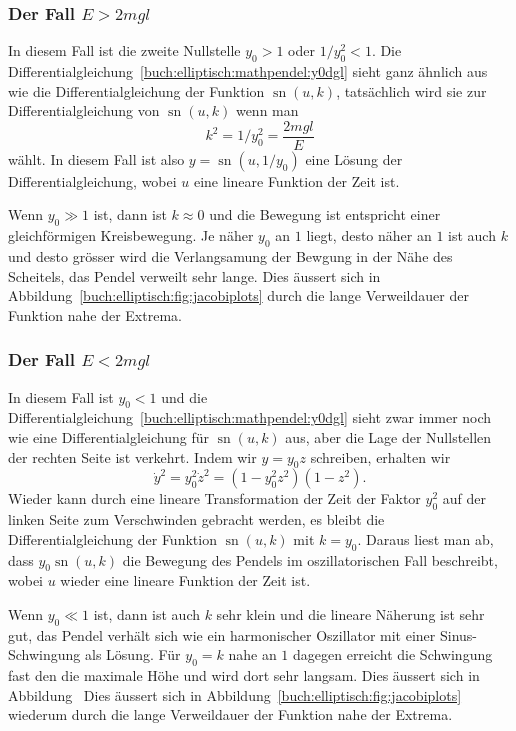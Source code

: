 \subsubsection{Der Fall $E>2mgl$}
In diesem Fall ist die zweite Nullstelle $y_0>1$ oder $1/y_0^2 < 1$.
Die Differentialgleichung~\eqref{buch:elliptisch:mathpendel:y0dgl}
sieht ganz ähnlich aus wie die Differentialgleichung der
Funktion $\operatorname{sn}(u,k)$, tatsächlich wird sie zur
Differentialgleichung von $\operatorname{sn}(u,k)$ wenn man
\[
k^2
=
1/y_0^2
=
\frac{2mgl}{E}
\]
wählt.
In diesem Fall ist also $y=\operatorname{sn}(u,1/y_0)$ eine Lösung
der Differentialgleichung, wobei $u$ eine lineare Funktion der Zeit
ist.

Wenn $y_0 \gg 1$ ist, dann ist $k\approx 0$ und die Bewegung ist
entspricht einer gleichförmigen Kreisbewegung.
Je näher $y_0$ an $1$ liegt, desto näher an $1$ ist auch $k$ und
desto grösser wird die Verlangsamung der Bewgung in der Nähe des
Scheitels, das Pendel verweilt sehr lange.
Dies äussert sich in Abbildung~\ref{buch:elliptisch:fig:jacobiplots}
durch die lange Verweildauer der Funktion nahe der Extrema.

%
%
\subsubsection{Der Fall $E<2mgl$}
In diesem Fall ist $y_0<1$ und die
Differentialgleichung~\eqref{buch:elliptisch:mathpendel:y0dgl}
sieht zwar immer noch wie eine Differentialgleichung für
$\operatorname{sn}(u,k)$ aus, aber die Lage der Nullstellen
der rechten Seite ist verkehrt.
Indem wir $y=y_0z$ schreiben, erhalten wir 
\begin{equation}
\dot{y}^2
=
y_0^2 \dot{z}^2
=
(1-y_0^2z^2)(1-z^2).
\end{equation}
Wieder kann durch eine lineare Transformation der Zeit der Faktor $y_0^2$
auf der linken Seite zum Verschwinden gebracht werden, es bleibt
die Differentialgleichung der Funktion $\operatorname{sn}(u,k)$
mit $k=y_0$.
Daraus liest man ab, dass $y_0\operatorname{sn}(u,k)$ die Bewegung
des Pendels im oszillatorischen Fall beschreibt, wobei $u$ wieder
eine lineare Funktion der Zeit ist.

Wenn $y_0\ll 1$ ist, dann ist auch $k$ sehr klein und die lineare
Näherung ist sehr gut, das Pendel verhält sich wie ein harmonischer
Oszillator mit einer Sinus-Schwingung als Lösung.
Für $y_0=k$ nahe an $1$ dagegen erreicht die Schwingung fast den
die maximale Höhe und wird dort sehr langsam.
Dies äussert sich in Abbildung~
Dies äussert sich in Abbildung~\ref{buch:elliptisch:fig:jacobiplots}
wiederum durch die lange Verweildauer der Funktion nahe der Extrema.

